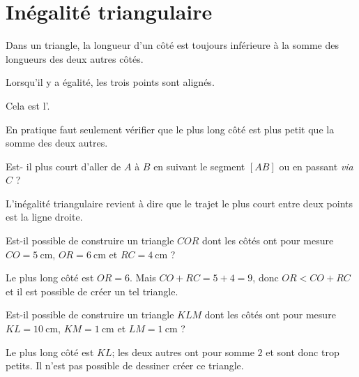 \section{Inégalité triangulaire}

\begin{Aretenir}
Dans un triangle, la longueur d'un côté est toujours inférieure à la somme des longueurs des deux autres côtés.

Lorsqu'il y a égalité, les trois points sont alignés.

Cela est l'.
\end{Aretenir}

En pratique faut seulement vérifier que le plus long côté est plus petit que la somme des deux autres.

\begin{example}
    Est- il plus court d'aller de \( A\) à \( B\) en suivant le segment \( [AB]\) ou en passant \emph{via} \( C\) ?
\end{example}

\begin{Aretenir}
    L'inégalité triangulaire revient à dire que le trajet le plus court entre deux points est la ligne droite.
\end{Aretenir}

\begin{example}
    Est-il possible de construire un triangle \( COR\) dont les côtés ont pour mesure \( CO=\SI{5}{\centi\meter}\), \( OR=\SI{6}{\centi\meter}\) et \( RC=\SI{4}{\centi\meter}\) ?

    Le plus long côté est \( OR=6\). Mais \( CO+RC=5+4=9\), donc \( OR<CO+RC\) et il est possible de créer un tel triangle.
\end{example}

\begin{example}
    Est-il possible de construire un triangle \( KLM\) dont les côtés ont pour mesure \( KL=\SI{10}{\centi\meter}\), \( KM=\SI{1}{\centi\meter}\) et \( LM=\SI{1}{\centi\meter}\) ?

    Le plus long côté est \( KL\); les deux autres ont pour somme \( 2\) et sont donc trop petits. Il n'est pas possible de dessiner créer ce triangle.

\begin{center}
   
\end{center}

\end{example}

